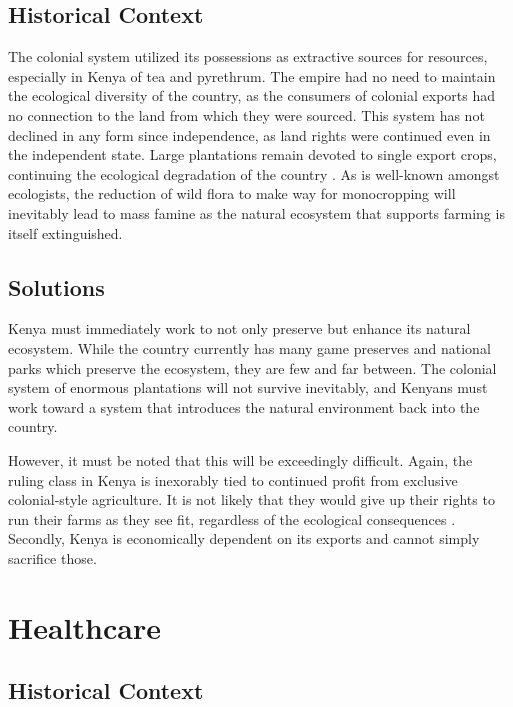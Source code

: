 \documentclass{../../../coursework}
\begin{document}
\subsection{Historical Context}

The colonial system utilized its possessions as extractive sources for
resources, especially in Kenya of tea and pyrethrum. The empire had no need to
maintain the ecological diversity of the country, as the consumers of colonial
exports had no connection to the land from which they were sourced. This
system has not declined in any form since independence, as land rights were
continued even in the independent state. Large plantations remain devoted to
single export crops, continuing the ecological degradation of the country
\parencite{Syagga2006}. As is well-known amongst ecologists, the reduction of
wild flora to make way for monocropping will inevitably lead to mass famine as
the natural ecosystem that supports farming is itself extinguished.

\subsection{Solutions}

Kenya must immediately work to not only preserve but enhance its natural
ecosystem. While the country currently has many game preserves and national
parks which preserve the ecosystem, they are few and far between. The colonial
system of enormous plantations will not survive inevitably, and Kenyans must
work toward a system that introduces the natural environment back into the
country.

However, it must be noted that this will be exceedingly difficult. Again, the
ruling class in Kenya is inexorably tied to continued profit from exclusive
colonial-style agriculture. It is not likely that they would give up their
rights to run their farms as they see fit, regardless of the ecological
consequences \parencite{Berg-Schlosser1982}. Secondly, Kenya is economically
dependent on its exports and cannot simply sacrifice those.

\section{Healthcare}
\subsection{Historical Context}
\end{document}

